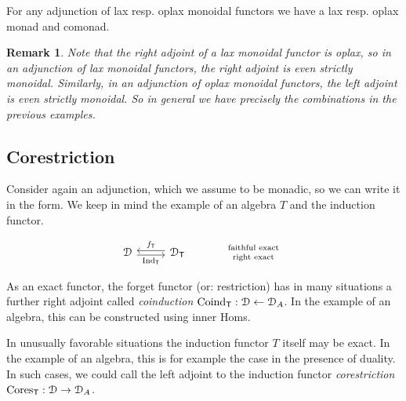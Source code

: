 \documentclass[a4paper, reqno]{amsart}
\newtheorem{remark}[theorem]{Remark}
\theoremstyle{introTheorems}
\renewcommand{\1}{\mathbbold{1}}
\begin{document}
For any adjunction of lax resp. oplax monoidal functors we have a lax resp. oplax monad and comonad.

\begin{remark}
Note that the right adjoint of a lax monoidal functor is oplax, so in an adjunction of lax monoidal functors, the right adjoint is even strictly monoidal. Similarly, in an adjunction of oplax monoidal functors, the left adjoint is even strictly monoidal. So in general we have precisely the combinations in the previous examples.
\end{remark}
 


\subsection{Corestriction}

Consider again an adjunction, which we assume to be monadic, so we can write it in the form. We keep in mind the example of an algebra $T$ and the induction functor.

\[\begin{tikzcd}[row sep=6ex, column sep=6ex]
\renewcommand{\arraystretch}{0.7}
\catD
\arrow[r, leftarrow, shift right=-2pt,"\forget_\monT"]
\arrow[r, rightarrow, swap,shift right=2pt,"\funT"]
& 
\catD_\monT
&
\begin{array}{c}
    \scriptstyle \textnormal{faithful exact}\\
    \scriptstyle \textnormal{right exact} \\
\end{array}
\end{tikzcd}\]

As an exact functor, the forget functor (or: restriction) has in many situations  a further right adjoint called \emph{coinduction} $\mathrm{Coind}_{\mathsf{T}}:\mathcal{D}\leftarrow \mathcal{D}_A$.  In the example of an algebra, this can be constructed using inner Homs. 

In {unusually} favorable situations  
the induction functor $T$ itself may be exact. In the example of an algebra, this  is for example the case in the presence of duality. In such cases, we could call the left adjoint to the induction functor \emph{corestriction} $\mathrm{Cores}_{\mathsf{T}}:\mathcal{D}\rightarrow \mathcal{D}_A$. 

\end{document}
